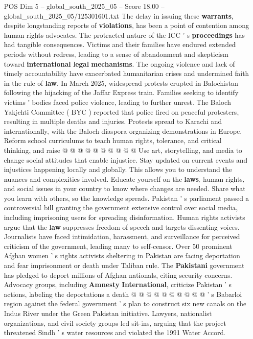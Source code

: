 \begin{textsample}{POS Dim 5 – global\_south\_2025\_05 – Score 18.00 – global\_south\_2025\_05/125301601.txt}
The delay in issuing these \textbf{warrants}, despite longstanding reports of \textbf{violations}, has been a point of contention among human rights advocates.
The protracted nature of the ICC ' s \textbf{proceedings} has had tangible consequences.
Victims and their families have endured extended periods without redress, leading to a sense of abandonment and skepticism toward \textbf{international} \textbf{legal} \textbf{mechanisms}.
The ongoing violence and lack of timely accountability have exacerbated humanitarian crises and undermined faith in the rule of \textbf{law}.
In March 2025, widespread protests erupted in Balochistan following the hijacking of the Jaffar Express train.
Families seeking to identify victims ' bodies faced police violence, leading to further unrest.
The Baloch Yakjehti Committee ( BYC ) reported that police fired on peaceful protesters, resulting in multiple deaths and injuries.
Protests spread to Karachi and internationally, with the Baloch diaspora organizing demonstrations in Europe.
Reform school curriculums to teach human rights, tolerance, and critical thinking, and raise @ @ @ @ @ @ @ @ @ @ Use art, storytelling, and media to change social attitudes that enable injustice.
Stay updated on current events and injustices happening locally and globally.
This allows you to understand the nuances and complexities involved.
Educate yourself on the \textbf{laws}, human rights, and social issues in your country to know where changes are needed.
Share what you learn with others, so the knowledge spreads.
Pakistan ' s parliament passed a controversial bill granting the government extensive control over social media, including imprisoning users for spreading disinformation.
Human rights activists argue that the \textbf{law} suppresses freedom of speech and targets dissenting voices.
Journalists have faced intimidation, harassment, and surveillance for perceived criticism of the government, leading many to self-censor.
Over 50 prominent Afghan women ' s rights activists sheltering in Pakistan are facing deportation and fear imprisonment or death under Taliban rule.
The \textbf{Pakistani} government has pledged to deport millions of Afghan nationals, citing security concerns.
Advocacy groups, including \textbf{Amnesty} \textbf{International}, criticize Pakistan ' s actions, labeling the deportations a death @ @ @ @ @ @ @ @ @ @ ' s Babarloi region against the federal government ' s plan to construct six new canals on the Indus River under the Green Pakistan initiative.
Lawyers, nationalist organizations, and civil society groups led sit-ins, arguing that the project threatened Sindh ' s water resources and violated the 1991 Water Accord.

\end{textsample}
